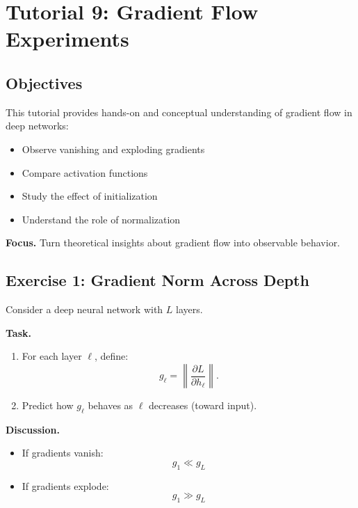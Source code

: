 \section{Tutorial 9: Gradient Flow Experiments}

\subsection{Objectives}

This tutorial provides hands-on and conceptual understanding of gradient flow in deep networks:

\begin{itemize}
    \item Observe vanishing and exploding gradients
    \item Compare activation functions
    \item Study the effect of initialization
    \item Understand the role of normalization
\end{itemize}

\medskip

\noindent
\textbf{Focus.}  
Turn theoretical insights about gradient flow into observable behavior.

\subsection{Exercise 1: Gradient Norm Across Depth}

Consider a deep neural network with $L$ layers.

\medskip

\noindent
\textbf{Task.}
\begin{enumerate}
    \item For each layer $\ell$, define:
    \[
    g_\ell = \left\|\frac{\partial L}{\partial h_\ell}\right\|.
    \]
    \item Predict how $g_\ell$ behaves as $\ell$ decreases (toward input).
\end{enumerate}

\medskip

\noindent
\textbf{Discussion.}

\begin{itemize}
    \item If gradients vanish:
    \[
    g_1 \ll g_L
    \]

    \item If gradients explode:
    \[
    g_1 \gg g_L
    \]
\end{itemize}

